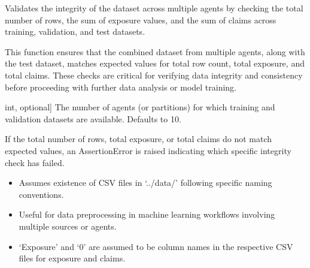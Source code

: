 \documentclass[letterpaper,10pt,english]{sphinxmanual}
\begin{document}

\begin{fulllineitems}
\label{\detokenize{utils:utils.row_check}}
\pysigstartsignatures
{}
\pysigstopsignatures
\sphinxAtStartPar
Validates the integrity of the dataset across multiple agents by checking the total number of rows, 
the sum of exposure values, and the sum of claims across training, validation, and test datasets.

\sphinxAtStartPar
This function ensures that the combined dataset from multiple agents, along with the test dataset,
matches expected values for total row count, total exposure, and total claims. These checks are critical for
verifying data integrity and consistency before proceeding with further data analysis or model training.
\begin{description}
\begin{description}
\sphinxlineitem{agents}{[}int, optional{]}
\sphinxAtStartPar
The number of agents (or partitions) for which training and validation datasets are available.
Defaults to 10.

\end{description}

\begin{description}
\sphinxAtStartPar
If the total number of rows, total exposure, or total claims do not match expected values, 
an AssertionError is raised indicating which specific integrity check has failed.

\end{description}

\begin{itemize}
\item {} 
\sphinxAtStartPar
Assumes existence of CSV files in ‘../data/’ following specific naming conventions.

\item {} 
\sphinxAtStartPar
Useful for data preprocessing in machine learning workflows involving multiple sources or agents.

\item {} 
\sphinxAtStartPar
‘Exposure’ and ‘0’ are assumed to be column names in the respective CSV files for exposure and claims.


\end{itemize}
\end{description}
\end{fulllineitems}
\end{document}

